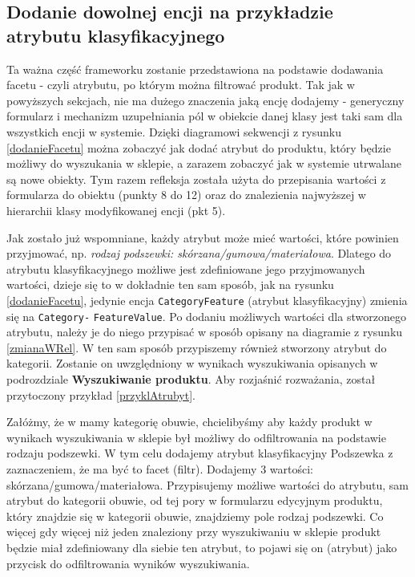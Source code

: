 \subsection{Dodanie dowolnej encji na przykładzie atrybutu klasyfikacyjnego}
Ta ważna część frameworku zostanie przedstawiona na podstawie dodawania facetu - czyli atrybutu, po którym można filtrować produkt. Tak jak w powyższych sekcjach, nie ma dużego znaczenia jaką encję dodajemy - generyczny formularz i mechanizm uzupełniania pól w obiekcie danej klasy jest taki sam dla wszystkich encji w systemie. Dzięki diagramowi sekwencji z rysunku \ref{dodanieFacetu} można zobaczyć jak dodać atrybut do produktu, który będzie możliwy do wyszukania w sklepie, a zarazem zobaczyć jak w systemie utrwalane są nowe obiekty. Tym razem refleksja została użyta do przepisania wartości z formularza do obiektu (punkty 8 do 12) oraz do znalezienia najwyższej w hierarchii klasy modyfikowanej encji (pkt 5). 

Jak zostało już wspomniane, każdy atrybut może mieć wartości, które powinien przyjmować, np. \textit{rodzaj podszewki: skórzana/gumowa/materiałowa}. Dlatego do atrybutu klasyfikacyjnego możliwe jest zdefiniowane jego przyjmowanych wartości, dzieje się to w dokładnie ten sam sposób, jak na rysunku \ref{dodanieFacetu}, jedynie encja \texttt{CategoryFeature} (atrybut klasyfikacyjny) zmienia się na \texttt{Category-} \texttt{FeatureValue}. Po dodaniu możliwych wartości dla stworzonego atrybutu, należy je do niego przypisać w sposób opisany na diagramie z rysunku \ref{zmianaWRel}. W ten sam sposób przypiszemy również stworzony atrybut do kategorii. Zostanie on uwzględniony w wynikach wyszukiwania opisanych w podrozdziale \textbf{Wyszukiwanie produktu}. Aby rozjaśnić rozważania, został przytoczony przykład \ref{przyklAtrubyt}.
\begin{example} 
	Załóżmy, że w mamy kategorię obuwie, chcielibyśmy aby każdy produkt w wynikach wyszukiwania w sklepie był możliwy do odfiltrowania na podstawie rodzaju podszewki. W tym celu dodajemy atrybut klasyfikacyjny Podszewka z zaznaczeniem, że ma być to facet (filtr). Dodajemy 3 wartości: skórzana/gumowa/materiałowa. Przypisujemy możliwe wartości do atrybutu, sam atrybut do kategorii obuwie, od tej pory w formularzu edycyjnym produktu, który znajdzie się w kategorii obuwie, znajdziemy pole rodzaj podszewki. Co więcej gdy więcej niż jeden znaleziony przy wyszukiwaniu w sklepie produkt będzie miał zdefiniowany dla siebie ten atrybut, to pojawi się on (atrybut) jako przycisk do odfiltrowania wyników wyszukiwania.  
	\label{przyklAtrubyt}
\end{example}
 
